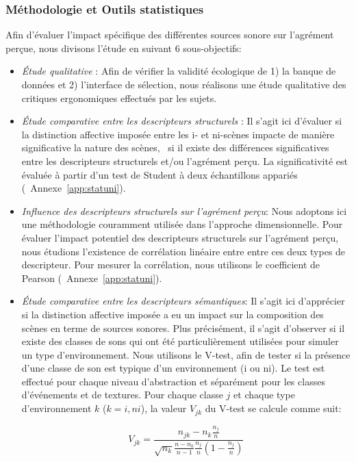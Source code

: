\subsubsection{Méthodologie et Outils statistiques}
\label{sec:ch5_methodoEtStat}

Afin d'évaluer l'impact spécifique des différentes sources sonore sur l'agrément perçue, nous divisons l'étude en suivant 6 sous-objectifs:

\begin{itemize}
\item \emph{Étude qualitative} : Afin de vérifier la validité écologique de 1) la banque de données et 2) l'interface de sélection, nous réalisons une étude qualitative des critiques ergonomiques effectués par les sujets.
\item \emph{Étude comparative entre les descripteurs structurels} : Il s'agit ici d'évaluer si la distinction affective imposée entre les i- et ni-scènes impacte de manière significative la nature des scènes, \ie~si il existe des différences significatives entre les descripteurs structurels et/ou l'agrément perçu. La significativité est évaluée à partir d'un test de Student à deux échantillons appariés (\Cf~Annexe~\ref{app:statuni}).
\item \emph{Influence des descripteurs structurels sur l'agrément perçu}: Nous adoptons ici une méthodologie couramment utilisée dans l'approche dimensionnelle. Pour évaluer l'impact potentiel des descripteurs structurels sur l'agrément perçu, nous étudions l'existence de corrélation linéaire entre entre ces deux types de descripteur. Pour mesurer la corrélation, nous utilisons le coefficient de Pearson (\Cf~Annexe~\ref{app:statuni}).
\item \emph{Étude comparative entre les descripteurs sémantiques}: Il s'agit ici d'apprécier si la distinction affective imposée a eu un impact sur la composition des scènes en terme de sources sonores. Plus précisément, il s'agit d'observer si il existe des classes de sons qui ont été particulièrement utilisées pour simuler un type d'environnement. Nous utilisons le V-test, afin de tester si la présence d'une classe de son est typique d'un environnement (i ou ni). Le test est effectué pour chaque niveau d'abstraction et séparément pour les classes d'événements et de textures. Pour chaque classe $j$ et chaque type d'environnement $k$ ($k={i,ni}$), la valeur $V_{jk}$ du V-test se calcule comme suit:

\begin{equation*}
V_{jk}=\dfrac{n_{jk}-n_k\frac{n_j}{n}}{\sqrt{n_k}\frac{n-n_k}{n-1}\frac{n_j}{n}(1-\frac{n_j}{n})}
\end{equation*}


\end{itemize}
